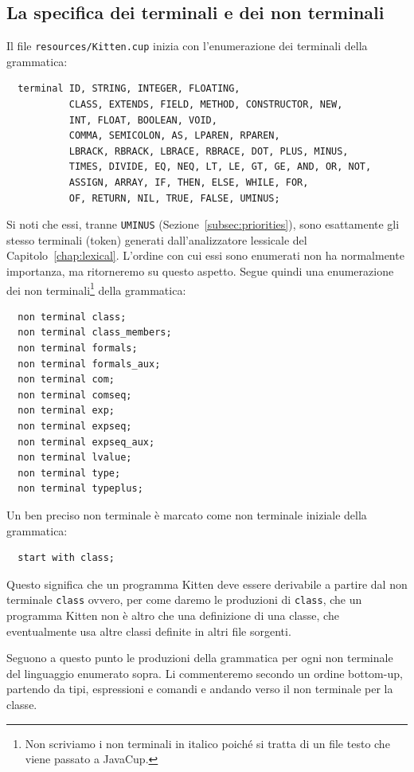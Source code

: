 \subsection{La specifica dei terminali e dei non terminali}
  \label{subsec:terminals}
%
Il file \texttt{resources/Kitten.cup}
inizia con l'enumerazione dei terminali della grammatica:
%
\begin{verbatim}
  terminal ID, STRING, INTEGER, FLOATING,
           CLASS, EXTENDS, FIELD, METHOD, CONSTRUCTOR, NEW,
           INT, FLOAT, BOOLEAN, VOID,
           COMMA, SEMICOLON, AS, LPAREN, RPAREN,
           LBRACK, RBRACK, LBRACE, RBRACE, DOT, PLUS, MINUS,
           TIMES, DIVIDE, EQ, NEQ, LT, LE, GT, GE, AND, OR, NOT,
           ASSIGN, ARRAY, IF, THEN, ELSE, WHILE, FOR,
           OF, RETURN, NIL, TRUE, FALSE, UMINUS;
\end{verbatim}
%
Si noti che essi, tranne \texttt{UMINUS} (Sezione~\ref{subsec:priorities}),
sono esattamente gli stesso terminali (token) generati
dall'analizzatore lessicale del Capitolo~\ref{chap:lexical}. L'ordine
con cui essi sono enumerati non ha normalmente importanza, ma
ritorneremo su questo aspetto.
Segue quindi una enumerazione dei non terminali\footnote{
Non scriviamo i non terminali
in italico poich\'e si tratta di un file testo che viene passato a JavaCup.}
della grammatica:
%
\begin{verbatim}
  non terminal class;
  non terminal class_members;
  non terminal formals;
  non terminal formals_aux;
  non terminal com;
  non terminal comseq;
  non terminal exp;
  non terminal expseq;
  non terminal expseq_aux;
  non terminal lvalue;
  non terminal type;
  non terminal typeplus;
\end{verbatim}
%
Un ben preciso non terminale \`e marcato come non terminale iniziale della
grammatica:
%
\begin{verbatim}
  start with class;
\end{verbatim}
%
Questo significa che un programma Kitten deve essere derivabile a partire
dal non terminale \texttt{class} ovvero, per come daremo le produzioni di
\texttt{class}, che un programma Kitten non \`e altro che una definizione
di una classe, che eventualmente usa altre classi definite in altri file
sorgenti.

Seguono a questo punto le produzioni della grammatica per ogni non terminale
del linguaggio enumerato sopra. Li commenteremo secondo un ordine bottom-up,
partendo \cioe da tipi, espressioni e comandi e andando verso
il non terminale per la classe.
%
